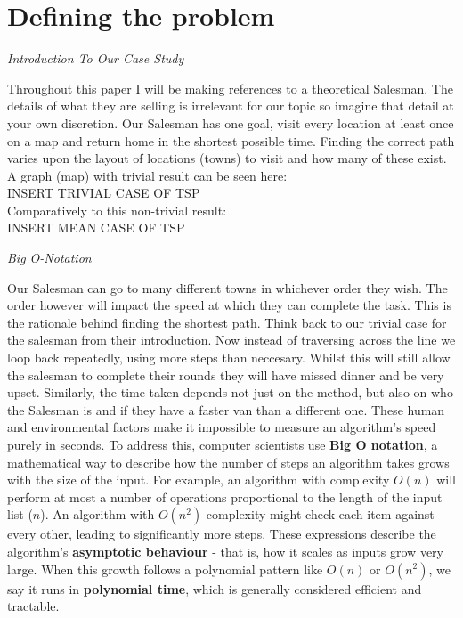 \documentclass[12pt]{report}
\begin{document}
\section*{Defining the problem}
\begin{center}
    \vspace{0.5cm}
    {\Large\itshape Introduction To Our Case Study\par}
\end{center}
Throughout this paper I will be making references to a theoretical Salesman.
The details of what they are selling is irrelevant for our topic so imagine that detail at your own discretion.
Our Salesman has one goal, visit every location at least once on a map and return home in the shortest possible time.
Finding the correct path varies upon the layout of locations (towns) to visit and how many of these exist. \\
\vspace{0.5cm}
A graph (map) with trivial result can be seen here:\\
\vspace{0.5cm}
INSERT TRIVIAL CASE OF TSP\\
\vspace{0.5cm}
Comparatively to this non-trivial result:\\
\vspace{0.5cm}
INSERT MEAN CASE OF TSP


\begin{center}
    \vspace{0cm}
    {\Large\itshape Big O-Notation\par}
\end{center}
Our Salesman can go to many different towns in whichever order they wish.
The order however will impact the speed at which they can complete the task.
This is the rationale behind finding the shortest path.
Think back to our trivial case for the salesman from their introduction.
Now instead of traversing across the line we loop back repeatedly, using more steps than neccesary.
Whilst this will still allow the salesman to complete their rounds they will have missed dinner and be very upset.
Similarly, the time taken depends not just on the method, but also on who the Salesman is and if they have a faster van than a different one.
These human and environmental factors make it impossible to measure an algorithm's speed purely in seconds.
To address this, computer scientists use \textbf{Big O notation}, a mathematical way to describe how the number of steps an algorithm takes grows with the size of the input.
For example, an algorithm with complexity $O(n)$ will perform at most a number of operations proportional to the length of the input list ($n$).
An algorithm with $O(n^2)$ complexity might check each item against every other, leading to significantly more steps.
These expressions describe the algorithm’s \textbf{asymptotic behaviour} - that is, how it scales as inputs grow very large.
When this growth follows a polynomial pattern like $O(n)$ or $O(n^2)$, we say it runs in \textbf{polynomial time}, which is generally considered efficient and tractable.
\end{document}
